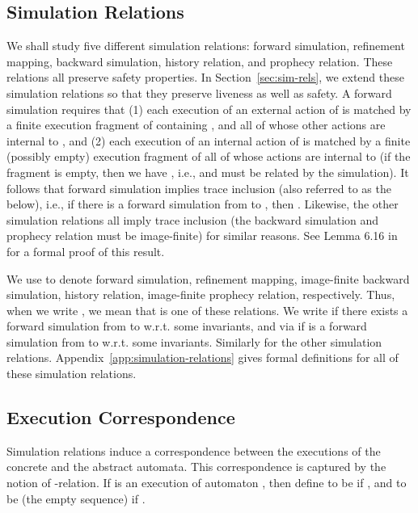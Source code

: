 \documentclass[11pt]{article}
\begin{document}
\subsection{Simulation Relations}
\label{sec:simulation-relations}

We shall study five different simulation relations: 
forward simulation, refinement mapping, backward simulation,
history relation, and prophecy relation.
These relations all preserve safety properties.
In Section~\ref{sec:sim-rels}, we extend these simulation relations so
that they preserve liveness as well as safety.
A forward simulation requires that (1) each execution of
an external action  of  is matched by a finite execution
fragment of  containing , and all of whose other actions are
internal to , and (2) each execution of an internal action of 
is matched by a finite (possibly empty) execution fragment of  all
of whose actions are internal to  (if the fragment
is empty, then we have , i.e.,  and  must be related by
the simulation).
It follows that forward simulation implies trace inclusion
(also referred to as the  below), i.e., 
if there is a forward simulation from  to , then
.
Likewise, the other simulation relations all imply trace inclusion (the backward
simulation and prophecy relation must be image-finite) for similar reasons.
See Lemma 6.16 in \cite{GSSL93} for a formal proof of this result.

We use  to denote forward simulation, refinement
mapping, image-finite backward simulation, history relation,
image-finite prophecy relation, respectively. 
Thus, when we write , we mean that  is
one of these relations.
We write  if there exists a forward simulation from 
to  w.r.t. some invariants, and 
 via  if  is a forward simulation from
 to  w.r.t. some invariants. Similarly for the other simulation relations.
Appendix~\ref{app:simulation-relations} gives formal definitions for
all of these simulation relations. 





\subsection{Execution Correspondence}

Simulation relations induce a correspondence between the executions of
the concrete and the abstract automata. This correspondence is
captured by the notion of -relation.
If  is an execution of automaton
, then define 
 to be  if , and
to be  (the empty sequence) if .
\end{document}
